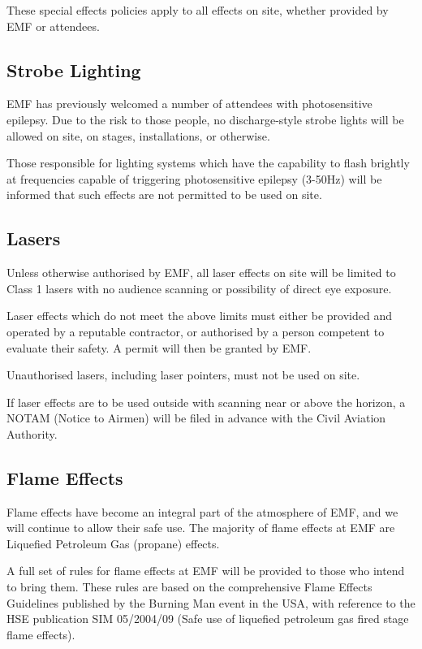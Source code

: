 These special effects policies apply to all effects on site, whether provided
by EMF or attendees.

\subsection{Strobe Lighting}
EMF has previously welcomed a number of attendees with photosensitive epilepsy.
Due to the risk to those people, no discharge-style strobe lights will be allowed
on site, on stages, installations, or otherwise.

Those responsible for lighting systems which have the capability to flash brightly
at frequencies capable of triggering photosensitive epilepsy (3-50Hz) will be
informed that such effects are not permitted to be used on site.

\subsection{Lasers}
Unless otherwise authorised by EMF, all laser effects on site will be limited to
Class 1 lasers with no audience scanning or possibility of direct eye exposure.

Laser effects which do not meet the above limits must either be provided and
operated by a reputable contractor, or authorised by a person competent to
evaluate their safety. A permit will then be granted by EMF.

Unauthorised lasers, including laser pointers, must not be used on site.

If laser effects are to be used outside with scanning near or above the
horizon, a NOTAM (Notice to Airmen) will be filed in advance with the Civil
Aviation Authority.

\subsection{Flame Effects}\label{flameeffects}
Flame effects have become an integral part of the atmosphere of EMF, and
we will continue to allow their safe use. The majority of flame effects
at EMF are Liquefied Petroleum Gas (propane) effects.

A full set of rules for flame effects at EMF will be provided to those
who intend to bring them. These rules are based on the comprehensive
Flame Effects Guidelines published by the Burning Man event in the USA,
with reference to the HSE publication SIM 05/2004/09 (Safe use of
liquefied petroleum gas fired stage flame effects).

